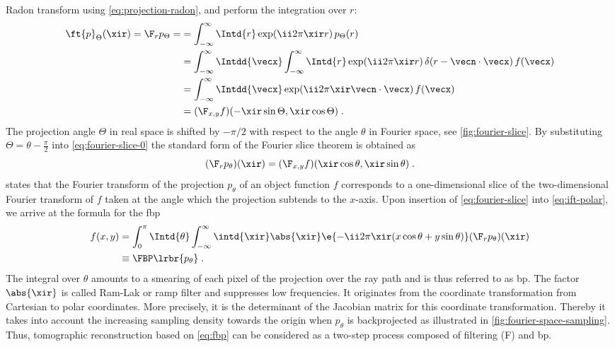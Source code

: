 \documentclass[
twoside,
openright,
titlepage,
numbers=noenddot,
headinclude,
fleqn,
a4paper,
footinclude=true,
cleardoublepage=empty,
abstractoff,
BCOR=5mm,
paper=a4,
fontsize=11pt,
british,ngerman,american,
]{scrreprt}
\begin{document}
Radon transform using \cref{eq:projection-radon}, and perform the
integration over $r$:
\begin{equation}
  \label{eq:fourier-slice-0}
  \begin{split}
    \ft{p}_\Theta(\xir) = \F_r p_\Theta = 
       & = \int_{-\infty}^\infty\Intd{r} \exp(\ii 2\pi\xir r)\,p_\Theta(r)
    \\ & = \int_{-\infty}^\infty\Intdd{\vecx} \int_{-\infty}^\infty\Intd{r}
    \exp(\ii 2\pi\xir r)\, \delta(r-\vecn\cdot\vecx)\, f(\vecx)  
    \\ & = \int_{-\infty}^\infty\Intdd{\vecx}
    \exp(\ii 2\pi\xir\vecn\cdot\vecx)\, f(\vecx)  
    \\ &= (\F_{x,y}f)(-\xir\sin\Theta,\xir\cos\Theta) \;.
  \end{split}
\end{equation}
The projection angle $\Theta$ in real space is shifted by $-\pi/2$
with respect to the angle $\theta$ in Fourier space, see
\cref{fig:fourier-slice}.  By substituting $\Theta =
\theta-\frac{\pi}{2}$ into \cref{eq:fourier-slice-0} the standard form
of the Fourier slice theorem is obtained as
\begin{equation}
  \label{eq:fourier-slice}
  (\F_r p_\theta)(\xir) = (\F_{x,y}f)(\xir\cos\theta,\xir\sin\theta)\;.
\end{equation}
 states that the Fourier transform of the
projection $p_\theta$ of an object function $f$
corresponds to a one-dimensional slice of the two-dimensional Fourier
transform of $f$ taken at the angle which the projection subtends to
the $x$-axis.  Upon insertion of \cref{eq:fourier-slice} into
\cref{eq:ift-polar}, we arrive at the formula for the \acf{fbp}
\begin{equation}
  \label{eq:fbp}
  \begin{split}
    f(x,y) 
    & = \int_0^{\pi}\Intd{\theta} \int_{-\infty}^\infty\intd{\xir}
    \abs{\xir} \e{-\ii 2\pi\xir( x\cos\theta + y\sin\theta)} 
    (\F_r p_\theta)(\xir) 
    \\ & \equiv \FBP \lrbr{p_{\theta}} \;.
  \end{split}
\end{equation}
The integral over $\theta$ amounts to a smearing of each pixel of the
projection over the ray path and is thus referred to as \acf{bp}.  The
factor $\abs{\xir}$ is called Ram-Lak or ramp filter and suppresses
low frequencies.  It originates from the coordinate transformation
from Cartesian to polar coordinates.  More precisely, it is the
determinant of the Jacobian matrix for this coordinate transformation.
Thereby it takes into account the increasing sampling density towards
the origin when ${p_\theta}$ is backprojected as illustrated in
\cref{fig:fourier-space-sampling}.  Thus, tomographic reconstruction
based on \cref{eq:fbp} can be considered as a two-step process
composed of filtering (F) and \acf{bp}.
\end{document}
